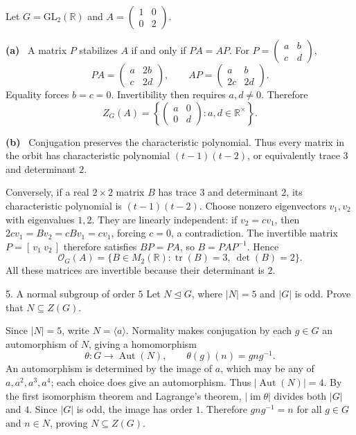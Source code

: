 \documentclass[11pt,letterpaper]{article}
\newcommand{\partlabel}[1]{\par\textbf{(#1)}\ }
\newcommand{\R}{\mathbb R}
\newcommand{\Aut}{\operatorname{Aut}}
\begin{document}
\begin{solution}
Let $G=\mathrm{GL}_2(\R)$ and $A=\begin{pmatrix}1&0\\0&2\end{pmatrix}$.
\partlabel{a} A matrix $P$ stabilizes $A$ if and only if $PA=AP$. For $P=\begin{pmatrix}a&b\\c&d\end{pmatrix}$,
\[
 PA=\begin{pmatrix}a&2b\\c&2d\end{pmatrix},\qquad
 AP=\begin{pmatrix}a&b\\2c&2d\end{pmatrix}.
\]
Equality forces $b=c=0$. Invertibility then requires $a,d\ne0$. Therefore
\[
 \boxed{Z_G(A)=\left\{\begin{pmatrix}a&0\\0&d\end{pmatrix}:a,d\in\R^{\times}\right\}.}
\]
\partlabel{b} Conjugation preserves the characteristic polynomial. Thus every matrix in the orbit has characteristic polynomial $(t-1)(t-2)$, or equivalently trace $3$ and determinant $2$.

Conversely, if a real $2\times2$ matrix $B$ has trace $3$ and determinant $2$, its characteristic polynomial is $(t-1)(t-2)$. Choose nonzero eigenvectors $v_1,v_2$ with eigenvalues $1,2$. They are linearly independent: if $v_2=cv_1$, then $2cv_1=Bv_2=cBv_1=cv_1$, forcing $c=0$, a contradiction. The invertible matrix $P=[\,v_1\ v_2\,]$ therefore satisfies $BP=PA$, so $B=PAP^{-1}$. Hence
\[
 \boxed{\mathcal{O}_G(A)=\{B\in M_2(\R):\operatorname{tr}(B)=3,\ \det(B)=2\}.}
\]
All these matrices are invertible because their determinant is $2$.
\end{solution}
\newpage
\begin{questionblock}{5. A normal subgroup of order $5$}
Let $N\trianglelefteq G$, where $|N|=5$ and $|G|$ is odd. Prove that $N\subseteq Z(G)$.
\end{questionblock}
\begin{solution}
Since $|N|=5$, write $N=\langle a\rangle$. Normality makes conjugation by each $g\in G$ an automorphism of $N$, giving a homomorphism
\[
 \theta:G\longrightarrow\Aut(N),\qquad\theta(g)(n)=gng^{-1}.
\]
An automorphism is determined by the image of $a$, which may be any of $a,a^2,a^3,a^4$; each choice does give an automorphism. Thus $|\Aut(N)|=4$. By the first isomorphism theorem and Lagrange's theorem, $|\operatorname{im}\theta|$ divides both $|G|$ and $4$. Since $|G|$ is odd, the image has order $1$. Therefore $gng^{-1}=n$ for all $g\in G$ and $n\in N$, proving $\boxed{N\subseteq Z(G)}$.
\end{solution}
\end{document}
